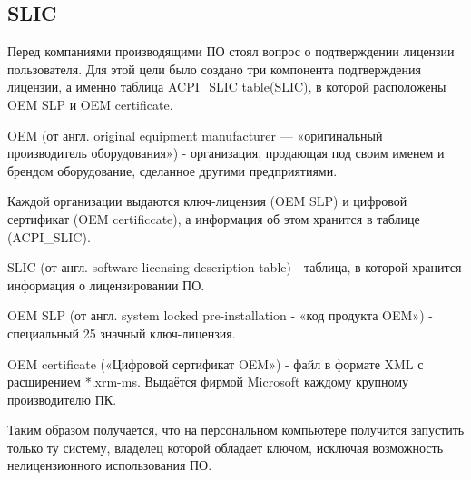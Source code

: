 \subsection{SLIC}

Перед компаниями производящими ПО стоял вопрос о подтверждении лицензии пользователя.
Для этой цели было создано три компонента подтверждения лицензии,
	а именно таблица ACPI\_SLIC table(SLIC),
		в которой расположены OEM SLP и OEM certificate.

OEM (от англ. original equipment manufacturer — «оригинальный производитель оборудования») -
организация, продающая под своим именем и брендом оборудование, сделанное другими предприятиями.

Каждой организации выдаются ключ-лицензия (OEM SLP) и цифровой сертификат (OEM certificcate), 
	а информация об этом хранится в таблице (ACPI\_SLIC).

SLIC (от англ. software licensing description table) - 
таблица, в которой хранится информация о лицензировании ПО.

OEM SLP (от англ. system locked pre-installation - «код продукта OEM») - 
специальный 25 значный ключ-лицензия.

OEM certificate («Цифровой сертификат OEM») -
файл в формате XML с расширением *.xrm-ms. Выдаётся фирмой Microsoft каждому крупному производителю ПК.

Таким образом получается,
	что на персональном компьютере получится запустить только ту систему,
		владелец которой обладает ключом,
	исключая возможность нелицензионного использования ПО.
